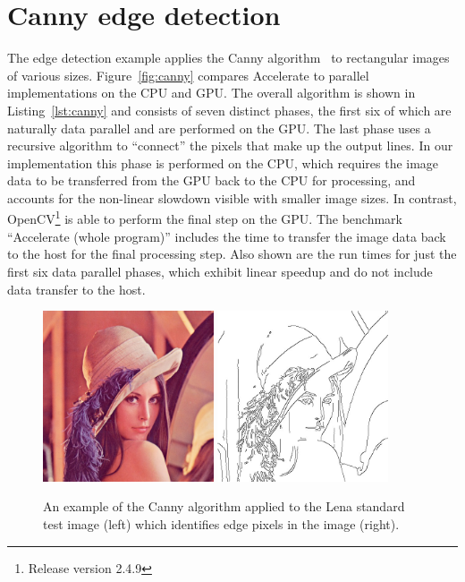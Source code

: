 \section{Canny edge detection}
\label{sec:canny}

The edge detection example applies the Canny algorithm~\cite{Canny:1986et} to
rectangular images of various sizes. Figure~\ref{fig:canny} compares Accelerate
to parallel implementations on the CPU and GPU\@. The overall algorithm is shown
in Listing~\ref{lst:canny} and consists of seven distinct phases, the first six
of which are naturally data parallel and are performed on the GPU\@. The last
phase uses a recursive algorithm to ``connect'' the pixels that make up the
output lines. In our implementation this phase is performed on the CPU, which
requires the image data to be transferred from the GPU back to the CPU for
processing, and accounts for the non-linear slowdown visible with smaller image
sizes. In contrast, OpenCV\footnote{Release version 2.4.9} is able to perform
the final step on the GPU\@. The benchmark ``Accelerate (whole program)''
includes the time to transfer the image data back to the host for the final
processing step. Also shown are the run times for just the first six data
parallel phases, which exhibit linear speedup and do not include data transfer
to the host.

\begin{figure}
    \begin{center}
        \includegraphics[width=0.45\textwidth]{images/results/canny/lena}
        \includegraphics[width=0.45\textwidth]{images/results/canny/lena-edges}
    \end{center}
    \caption[Example of the Canny edge detection algorithm]{An example of the
        Canny algorithm applied to the Lena standard test image (left) which
        identifies edge pixels in the image (right).}
    \label{fig:lena}
\end{figure}

